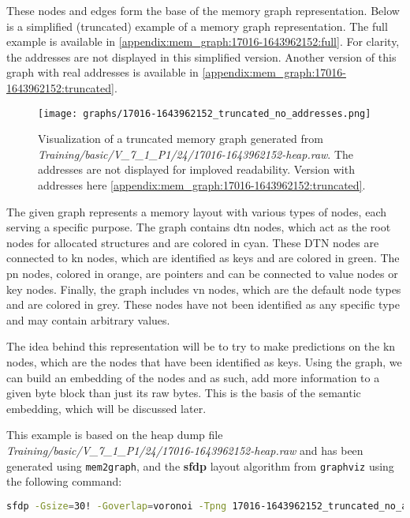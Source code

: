 These nodes and edges form the base of the memory graph representation. Below is a simplified (truncated) example of a memory graph representation. The full example is available in \ref{appendix:mem_graph:17016-1643962152:full}. For clarity, the addresses are not displayed in this simplified version. Another version of this graph with real addresses is available in \ref{appendix:mem_graph:17016-1643962152:truncated}.

\begin{figure}[H]\label{appendix:mem_graph:17016-1643962152:simplified}
    \centering
    \texttt{[image: graphs/17016-1643962152\_truncated\_no\_addresses.png]}
    \caption{Visualization of a truncated memory graph generated from \textit{Training/basic/V\_7\_1\_P1/24/17016-1643962152-heap.raw}. The addresses are not displayed for imploved readability. Version with addresses here \ref{appendix:mem_graph:17016-1643962152:truncated}.}
\end{figure}

The given graph represents a memory layout with various types of nodes, each serving a specific purpose. The graph contains \gls{dtn} nodes, which act as the root nodes for allocated structures and are colored in cyan. These DTN nodes are connected to \gls{kn} nodes, which are identified as keys and are colored in green. The \gls{pn} nodes, colored in orange, are pointers and can be connected to value nodes or key nodes. Finally, the graph includes \gls{vn} nodes, which are the default node types and are colored in grey. These nodes have not been identified as any specific type and may contain arbitrary values.

The idea behind this representation will be to try to make predictions on the \gls{kn} nodes, which are the nodes that have been identified as keys. Using the graph, we can build an embedding of the nodes and as such, add more information to a given byte block than just its raw bytes. This is the basis of the semantic embedding, which will be discussed later.

This example is based on the heap dump file \textit{Training/basic/V\_7\_1\_P1/24/17016-1643962152-heap.raw} and has been generated using \texttt{mem2graph}, and the \textbf{sfdp} layout algorithm from \texttt{graphviz} using the following command:

\begin{lstlisting}[language=bash, caption={Command used to generate the memory graph visualization of \textit{Training/basic/V\_7\_1\_P1/24/17016-1643962152-heap.raw}}]
    sfdp -Gsize=30! -Goverlap=voronoi -Tpng 17016-1643962152_truncated_no_addresses.gv > 17016-1643962152_truncated_no_addresses.png
\end{lstlisting}

